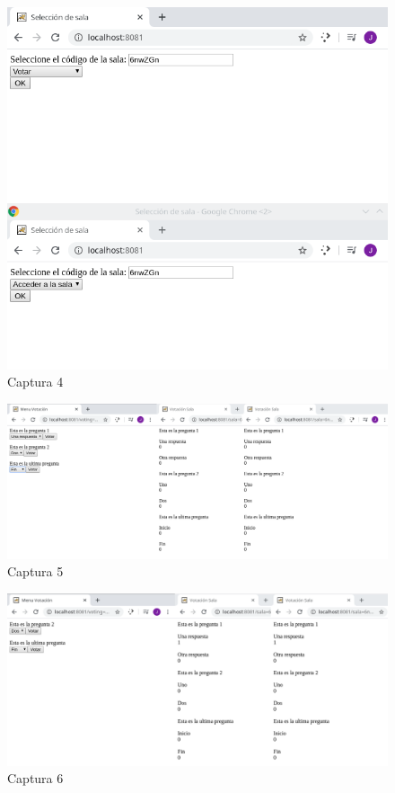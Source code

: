 \documentclass{article}
\begin{document}
\begin{itemize}
	\begin{figure}[H]
		\centering
		\includegraphics[totalheight=10.25cm]{img/cap4}
		\caption{Captura 4}
		\label{fig:figura5}
	\end{figure}

	\begin{figure}[H]
		\centering
		\includegraphics[totalheight=9cm]{img/cap5}
		\caption{Captura 5}
		\label{fig:figura6}
	\end{figure}

	\begin{figure}[H]
		\centering
		\includegraphics[totalheight=9cm]{img/cap6}
		\caption{Captura 6}
		\label{fig:figura7}
	\end{figure}


\end{itemize}
\end{document}
